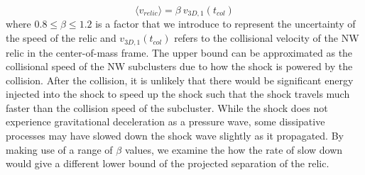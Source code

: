 \begin{equation}
	\langle v_{relic} \rangle = \beta~v_{3D,1}(t_{col})  
\end{equation}
where $0.8 \leq \beta \leq 1.2$ is a factor that we introduce to represent the
uncertainty of the speed of the relic and $v_{3D,1}(t_{col})$ refers to the collisional velocity of
the NW relic in the center-of-mass frame. The upper bound can be
approximated as the collisional speed of the NW subclusters due to how the
shock is powered by the collision. After the collision, it is unlikely that
there would be significant energy injected into the shock to speed up the
shock such that the shock travels much faster than the collision speed of the subcluster. While the shock does not experience gravitational deceleration as a
pressure wave, some dissipative processes may have slowed down the shock
wave slightly as it propagated. By making use of a
range of $\beta$ values, we examine the how the rate of slow down would
give a different lower bound of the projected separation of the relic.   







